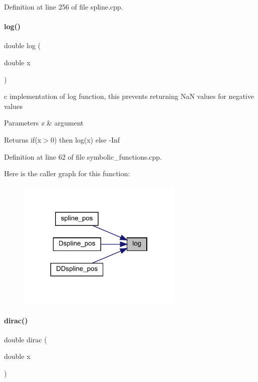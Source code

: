 Definition at line 256 of file spline.\+cpp.

\mbox{\label{namespaceamici_adb302c9aafbaa5e180d9f60ee954bb82}} 
\paragraph{\texorpdfstring{log()}{log()}}
{\footnotesize\ttfamily double log (\begin{DoxyParamCaption}\item[{double}]{x }\end{DoxyParamCaption})}

c implementation of log function, this prevents returning NaN values for negative values


\begin{DoxyParams}{Parameters}
{\em x} & argument \\
\hline
\end{DoxyParams}
\begin{DoxyReturn}{Returns}
if(x$>$0) then log(x) else -\/Inf 
\end{DoxyReturn}


Definition at line 62 of file symbolic\+\_\+functions.\+cpp.

Here is the caller graph for this function\+:
\nopagebreak
\begin{figure}[H]
\begin{center}
\leavevmode
\includegraphics[width=224pt]{namespaceamici_adb302c9aafbaa5e180d9f60ee954bb82_icgraph}
\end{center}
\end{figure}
\mbox{\label{namespaceamici_a30a33546875b9dd1a63c29312b316f7e}} 
\paragraph{\texorpdfstring{dirac()}{dirac()}}
{\footnotesize\ttfamily double dirac (\begin{DoxyParamCaption}\item[{double}]{x }\end{DoxyParamCaption})}


